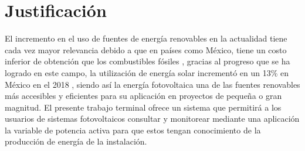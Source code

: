 \section{Justificación}
El incremento en el uso de fuentes de energía renovables en la actualidad tiene cada vez mayor relevancia debido a que en países como México, tiene un costo inferior de obtención que los combustibles fósiles \citep{Not1}, gracias al progreso que se ha logrado en este campo, la utilización de energía solar incrementó en un 13\% en México en el 2018 \citep{Not2}, siendo así la energía fotovoltaica una de las fuentes renovables más accesibles y eficientes para su aplicación en proyectos de pequeña o gran magnitud.
El presente trabajo terminal ofrece un sistema que permitirá a los usuarios de sistemas fotovoltaicos consultar y monitorear mediante una aplicación la variable de potencia activa para que estos tengan conocimiento de la producción de energía de la instalación.
